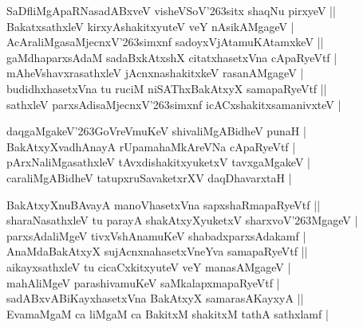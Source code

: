\begin{entry}
\smallskip
\begin{shl}
SaDfliMgApaRNasadABxveV visheVSoV{\char'263}sitx shaqNu pirxyeV ||\\[2pt]
BakatxsathxleV kirxyAshakitxyuteV veY nAsikAMgageV |\\[3pt]
AcAraliMgasaMjecnxV{\char'263}simxnf sadoyxVjAtamuKAtamxkeV ||\\[2pt]
gaMdhaparxsAdaM sadaBxkAtxshX citatxhasetxVna cApaRyeVtf |\\[2pt]
mAheVshavxrasathxleV jAcnxnashakitxkeV rasanAMgageV |\\[3pt]
budidhxhasetxVna tu ruciM niSAThxBakAtxyX samapaRyeVtf ||\\[2pt]
sathxleV parxsAdisaMjecnxV{\char'263}simxnf icACxshakitxsamanivxteV |
\end{shl}
\begin{shl}
daqgaMgakeV{\char'263}GoVreVmuKeV shivaliMgABidheV punaH |\\[2pt]
BakAtxyXvadhAnayA rUpamahaMkAreVNa cApaRyeVtf |\\[2pt]
pArxNaliMgasathxleV tAvxdishakitxyuketxV tavxgaMgakeV |\\[2pt]
caraliMgABidheV tatupxruSavaketxrXV daqDhavarxtaH |
\end{shl}
\begin{shl}
BakAtxyXnuBAvayA manoVhasetxVna sapxshaRmapaRyeVtf ||\\[2pt]
sharaNasathxleV tu parayA shakAtxyXyuketxV sharxvoV{\char'263}MgageV |\\[2pt]
parxsAdaliMgeV tivxVshAnamuKeV shabadxparxsAdakamf |\\[2pt]
AnaMdaBakAtxyX sujAcnxnahasetxVneYva samapaRyeVtf ||\\[2pt]
aikayxsathxleV tu cicaCxkitxyuteV veY manasAMgageV |\\[2pt]
mahAliMgeV parashivamuKeV saMkalapxmapaRyeVtf |\\[2pt]
sadABxvABiKayxhasetxVna BakAtxyX samarasAKayxyA ||\\[2pt]
EvamaMgaM ca liMgaM ca BakitxM shakitxM tathA sathxlamf |\\[2pt]

\end{shl}
\end{entry}
